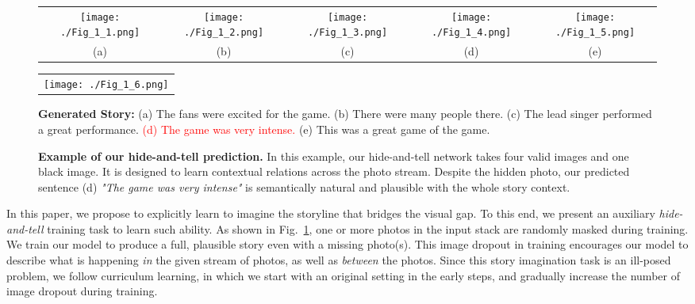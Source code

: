 \documentclass[letterpaper]{article} \usepackage{aaai20}  \usepackage{times}  \usepackage{helvet} \usepackage{courier}  \usepackage[hyphens]{url}  \usepackage{graphicx} \urlstyle{rm} \def\UrlFont{\rm}  \usepackage{graphicx}  \frenchspacing  \setlength{\pdfpagewidth}{8.5in}  \setlength{\pdfpageheight}{11in}
\newcommand{\figref}[1]{Fig.~\ref{#1}}
\begin{document}
\begin{figure}[t]
\begin{center}
\def\arraystretch{1.0}
\begin{tabular}{@{}c@{\hskip 0.005\textwidth }c@{\hskip 0.005\textwidth }c@{\hskip 0.005\textwidth }c@{\hskip 0.005\textwidth }c@{}}
\texttt{[image: ./Fig\_1\_1.png]} & \texttt{[image: ./Fig\_1\_2.png]} &
\texttt{[image: ./Fig\_1\_3.png]} & \texttt{[image: ./Fig\_1\_4.png]} &
\texttt{[image: ./Fig\_1\_5.png]} \\
(a) & (b) & (c) & (d) & (e) \\
\end{tabular}
\begin{tabular}{@{}c@{}}
\texttt{[image: ./Fig\_1\_6.png]} \\
\end{tabular}
\end{center}
\textbf{Generated Story:} (a) The fans were excited for the game. (b) There were many people there. (c) The lead singer performed a great performance. \textcolor{red}{(d) The game was very intense.} (e) This was a great game of the game.
\caption{\textbf{Example of our hide-and-tell prediction.} In this example, our hide-and-tell network takes four valid images and one black image. It is designed to learn contextual relations across the photo stream. Despite the hidden photo, our predicted sentence (d) \textit{"The game was very intense"} is semantically natural and plausible with the whole story context. }
\label{fig:teaser}
\end{figure}


In this paper, we propose to explicitly learn to imagine the storyline that bridges the visual gap. To this end, we present an auxiliary \textit{hide-and-tell} training task to learn such ability. As shown in \figref{fig:teaser}, one or more photos in the input stack are randomly masked during training. We train our model to produce a full, plausible story even with a missing photo(s). This image dropout in training encourages our model to describe what is happening \textit{in} the given stream of photos, as well as \textit{between} the photos. Since this story imagination task is an ill-posed problem, we follow curriculum learning, in which we start with an original setting in the early steps, and gradually increase the number of image dropout during training.
\end{document}

